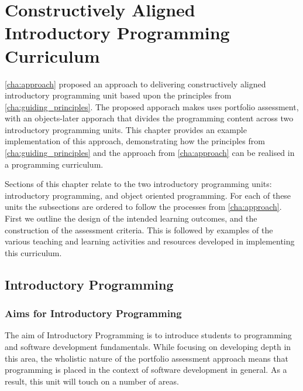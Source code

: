 
\chapter{Constructively Aligned Introductory Programming Curriculum} %
\label{cha:example_impl}

\graphicspath{{Figures/CAIntroProg/}}

\cref{cha:approach} proposed an approach to delivering constructively aligned introductory programming unit based upon the principles from \cref{cha:guiding_principles}. The proposed apporach makes uses portfolio assessment, with an objects-later apporach that divides the programming content across two introductory programming units. This chapter provides an example implementation of this approach, demonstrating how the principles from \cref{cha:guiding_principles} and the approach from \cref{cha:approach} can be realised in a programming curriculum.

Sections of this chapter relate to the two introductory programming units: introductory programming, and object oriented programming. For each of these units the subsections are ordered to follow the processes from \cref{cha:approach}. First we outline the design of the intended learning outcomes, and the construction of the assessment criteria. This is followed by examples of the various teaching and learning activities and resources developed in implementing this curriculum.  


\section{Introductory Programming} %
\label{sec:introductory_programming}

\subsection{Aims for Introductory Programming} %
\label{ssub:intro:aims}

The aim of Introductory Programming is to introduce students to programming and software development fundamentals. While focusing on developing depth in this area, the wholistic nature of the portfolio assessment approach means that programming is placed in the context of software development in general. As a result, this unit will touch on a number of areas.



